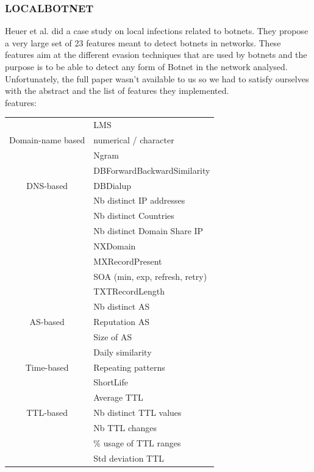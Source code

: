 \subsubsection{LOCALBOTNET}
Heuer et al.\cite{localbotnet} did a case study on local infections related to botnets. They propose a very large set of 23 features meant to detect botnets in networks. These features aim at the different evasion techniques that are used by botnets and the purpose is to be able to detect any form of Botnet in the network analysed. Unfortunately, the full paper wasn't available to us so we had to satisfy ourselves with the abstract and the list of features they implemented.\\
features:
\begin{tabular}{c|l}
\hline
 & LMS\\
Domain-name based & numerical / character\\
& Ngram\\
\hline
 & DBForwardBackwardSimilarity\\
DNS-based & DBDialup\\
& Nb distinct IP addresses\\
& Nb distinct Countries\\
& Nb distinct Domain Share IP\\
& NXDomain\\
& MXRecordPresent\\
& SOA (min, exp, refresh, retry)\\
& TXTRecordLength\\
\hline
 & Nb distinct AS\\
AS-based & Reputation AS\\
& Size of AS\\
\hline
 & Daily similarity\\
Time-based & Repeating patterns\\
& ShortLife\\
\hline
 & Average TTL\\
TTL-based & Nb distinct TTL values\\
& Nb TTL changes\\
& \% usage of TTL ranges\\
& Std deviation TTL\\
\end{tabular}

